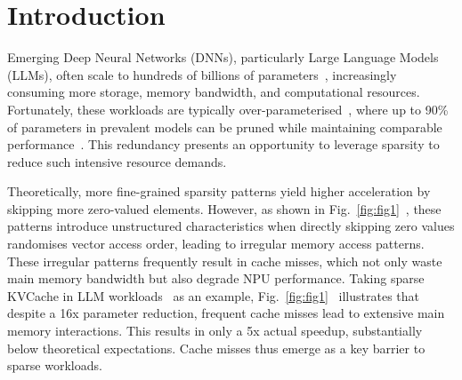 \section{Introduction}
\vspace{-3pt}
Emerging Deep Neural Networks (DNNs), particularly Large Language Models (LLMs), often scale to hundreds of billions of parameters~\cite{1llms, yang2024efficient}, increasingly consuming more storage, memory bandwidth, and computational resources.
Fortunately, these workloads are typically over-parameterised~\cite{han2015learning}, where up to 90\% of parameters in prevalent models can be pruned while maintaining comparable performance~\cite{3sparsity}.
This redundancy presents an opportunity to leverage sparsity to reduce such intensive resource demands. 

Theoretically, more fine-grained sparsity patterns yield higher acceleration by skipping more zero-valued elements.
However, as shown in Fig.~\ref{fig:fig1}~, these patterns introduce unstructured characteristics when directly skipping zero values randomises vector access order, leading to irregular memory access patterns. These irregular patterns frequently result in cache misses, which not only waste main memory bandwidth but also degrade NPU performance.
Taking sparse KVCache in LLM workloads~\cite{21doublesparsity} as an example, Fig.~\ref{fig:fig1}~ illustrates that despite a 16x parameter reduction, frequent cache misses lead to extensive main memory interactions. 
This results in only a 5x actual speedup, substantially below theoretical expectations. Cache misses thus emerge as a key barrier to sparse workloads.





